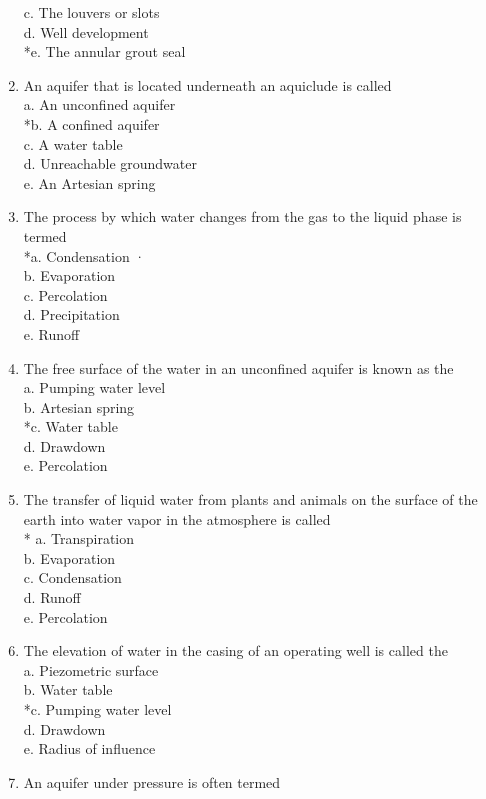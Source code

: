 \begin{enumerate}[1.]
 c. The louvers or slots\\
 d. Well development\\
 *e. The annular grout seal\\
 \item An aquifer that is located underneath an aquiclude is called\\
 a. An unconfined aquifer\\
 *b. A confined aquifer\\
 c. A water table\\
 d. Unreachable groundwater\\
 e. An Artesian spring\\
 \item The process by which water changes from the gas to the liquid phase is termed\\
 *a. Condensation ·\\
 b. Evaporation\\
 c. Percolation\\
 d. Precipitation\\
 e. Runoff\\
 \item The free surface of the water in an unconfined aquifer is known as the\\
 a. Pumping water level\\
 b. Artesian spring\\
 *c. Water table\\
 d. Drawdown\\
 e. Percolation\\
 \item The transfer of liquid water from plants and animals on the surface of the earth into water vapor in the atmosphere is called\\
* a. Transpiration\\
 b. Evaporation\\
 c. Condensation\\
 d. Runoff\\
 e. Percolation\\
 \item The elevation of water in the casing of an operating well is called the\\
 a. Piezometric surface\\
 b. Water table\\
 *c. Pumping water level\\
 d. Drawdown\\
 e. Radius of influence\\
 \item An aquifer under pressure is often termed\\

\end{enumerate}
